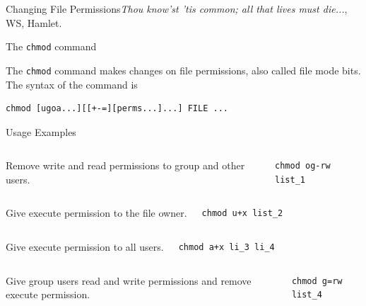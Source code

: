 \begin{frame}[t,fragile]{Changing File Permissions}{\emph{Thou know'st 'tis common; all that lives must die...}, WS, Hamlet.}
  \vspace{-0.3cm}
  \begin{block}{The  \alert{\texttt{chmod}} command}
    {\footnotesize
The  \alert{\texttt{chmod}} command makes changes on file permissions,
also called file mode bits. The syntax of the command is

      \begin{lstlisting}
chmod [ugoa...][[+-=][perms...]...] FILE ...
      \end{lstlisting}
 
Usage Examples}
{\scriptsize

  \begin{columns}
      Remove write and read permissions to group and other users.
        \hspace{-3cm}
        \begin{lstlisting}
chmod og-rw list_1
        \end{lstlisting}
    \end{columns}
  \begin{columns}
      Give execute permission to the file owner.
        \hspace{-3cm}
        \begin{lstlisting}
chmod u+x list_2
        \end{lstlisting}
    \end{columns}
  \begin{columns}
      Give execute permission to all users.
        \hspace{-3cm}
        \begin{lstlisting}
chmod a+x li_3 li_4
        \end{lstlisting}
    \end{columns}
  \begin{columns}
      Give group users read and write permissions and remove execute permission.
        \hspace{-3cm}
        \begin{lstlisting}
chmod g=rw list_4
        \end{lstlisting}
    \end{columns}
  }
  \end{block}
  
\end{frame}
